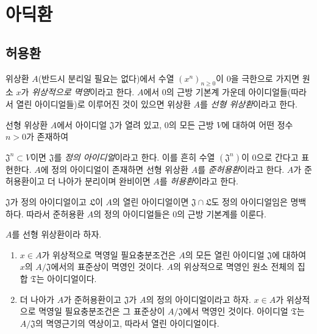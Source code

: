 \section{아딕환}
\label{section:0.7-ko}

\subsection{허용환}
\label{subsection:0.7.1-ko}

\begin{env}[7.1.1]
\label{0.7.1.1-ko}
위상환 $A$(반드시 분리일 필요는 없다)에서 수열
$(x^n)_{n\geq0}$이 $0$을 극한으로 가지면 원소 $x$가
\emph{위상적으로 멱영}이라고 한다. $A$에서 $0$의 근방 기본계
가운데 아이디얼들(따라서 열린 아이디얼들)로 이루어진 것이 있으면
위상환 $A$를 \emph{선형 위상환}이라고 한다.
\end{env}

\begin{definition}[7.1.2]
\label{0.7.1.2-ko}
선형 위상환 $A$에서 아이디얼 $\mathfrak J$가 열려 있고, $0$의
모든 근방 $V$에 대하여 어떤 정수 $n>0$가 존재하여


$\mathfrak J^n\subset V$이면 $\mathfrak J$를 \emph{정의 아이디얼}이라고
한다. 이를 흔히 수열 $(\mathfrak J^n)$이 $0$으로 간다고 표현한다.
$A$에 정의 아이디얼이 존재하면 선형 위상환 $A$를
\emph{준허용환}이라고 한다. $A$가 준허용환이고 더 나아가 분리이며
완비이면 $A$를 \emph{허용환}이라고 한다.
\end{definition}

$\mathfrak J$가 정의 아이디얼이고 $\mathfrak L$이 $A$의 열린
아이디얼이면 $\mathfrak J\cap\mathfrak L$도 정의 아이디얼임은
명백하다. 따라서 준허용환 $A$의 정의 아이디얼들은 $0$의 근방
기본계를 이룬다.

\begin{lemma}[7.1.3]
\label{0.7.1.3-ko}
$A$를 선형 위상환이라 하자.
\begin{enumerate}
  \item[{\upshape(i)}] $x\in A$가 위상적으로 멱영일 필요충분조건은
    $A$의 모든 열린 아이디얼 $\mathfrak J$에 대하여 $x$의
    $A/\mathfrak J$에서의 표준상이 멱영인 것이다. $A$의 위상적으로
    멱영인 원소 전체의 집합 $\mathfrak T$는 아이디얼이다.
  \item[{\upshape(ii)}] 더 나아가 $A$가 준허용환이고 $\mathfrak J$가
    $A$의 정의 아이디얼이라고 하자. $x\in A$가 위상적으로 멱영일
    필요충분조건은 그 표준상이 $A/\mathfrak J$에서 멱영인 것이다.
    아이디얼 $\mathfrak T$는 $A/\mathfrak J$의 멱영근기의 역상이고,
    따라서 열린 아이디얼이다.
\end{enumerate}
\end{lemma}

